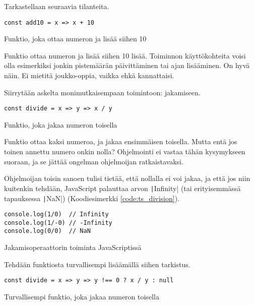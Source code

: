 Tarkastellaan seuraavia tilanteita.

\begin{code}
    \begin{verbatim}
const add10 = x => x + 10  
\end{verbatim}
    \caption{Funktio, joka ottaa numeron ja lisää siihen 10}
    \label{code:ts_set_theory_1}
\end{code}

Funktio ottaa numeron ja lisää siihen 10 lisää. Toiminnon käyttökohteita voisi olla esimerkiksi jonkin pistemäärän päivittäminen tai ajan lisääminen. On hyvä näin. Ei mietitä joukko-oppia, vaikka ehkä kannattaisi.

Siirrytään askelta monimutkaisempaan toimintoon: jakamiseen.


\begin{code}
    \begin{verbatim}
const divide = x => y => x / y
\end{verbatim}
    \caption{Funktio, joka jakaa numeron toisella}
    \label{code:ts_set_theory_3}
\end{code}

Funktio ottaa kaksi numeroa, ja jakaa ensimmäisen toisella. Mutta entä jos toinen annettu numero onkin nolla? Ohjelmointi ei vastaa tähän kysymykseen suoraan, ja se jättää ongelman ohjelmoijan ratkaistavaksi.

Ohjelmoijan toisin sanoen tulisi tietää, että nollalla ei voi jakaa, ja että jos niin kuitenkin tehdään, JavaScript palauttaa arvon \texttt|Infinity| (tai erityisemmässä tapauksessa \texttt|NaN|) (Koodiesimerkki \ref{code:ts_division}).

\begin{code}
    \begin{verbatim}
console.log(1/0)  // Infinity
console.log(1/-0) // -Infinity
console.log(0/0)  // NaN
\end{verbatim}
    \caption{Jakamisoperaattorin toiminta JavaScriptissä}
    \label{code:ts_division}
\end{code}

Tehdään funktiosta turvallisempi lisäämällä siihen tarkistus.


\begin{code}
    \begin{verbatim}
const divide = x => y => y !== 0 ? x / y : null
\end{verbatim}
    \caption{Turvallisempi funktio, joka jakaa numeron toisella}
    \label{code:ts_set_theory_4}
\end{code}

